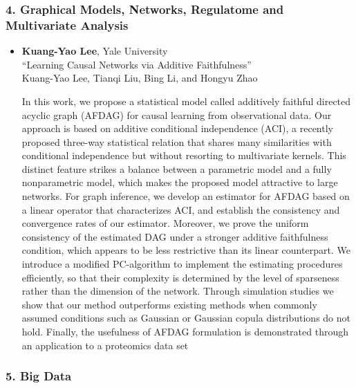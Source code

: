 \subsubsection*{4. Graphical Models, Networks, Regulatome and Multivariate Analysis}

\begin{itemize}
\item \textbf{Kuang-Yao Lee}, Yale University \\
``Learning Causal Networks via Additive Faithfulness'' \\
Kuang-Yao Lee, Tianqi Liu, Bing Li, and Hongyu Zhao


In this work, we propose a statistical model called additively faithful directed acyclic graph (AFDAG) for causal learning from observational data. Our approach is based on additive conditional independence (ACI), a recently proposed three-way statistical relation that shares many similarities with conditional independence but without resorting to multivariate kernels. This distinct feature strikes a balance between a parametric model and a fully nonparametric model, which makes the proposed model attractive to large networks. For graph inference, we develop an estimator  for AFDAG  based on a linear operator  that characterizes ACI, and establish the consistency and convergence rates of our estimator. Moreover, we prove the uniform consistency of the estimated DAG under a stronger additive faithfulness condition, which appears to be less restrictive than its linear counterpart. We introduce a modified PC-algorithm to implement the estimating procedures efficiently, so that their complexity is determined by the level of sparseness rather than the dimension of the network. Through simulation studies we show that our method outperforms  existing methods when commonly assumed conditions such as Gaussian or Gaussian copula distributions do not hold. Finally, the usefulness of AFDAG formulation is demonstrated through an application to a proteomics data set

\end{itemize}

\subsubsection*{5. Big Data}

